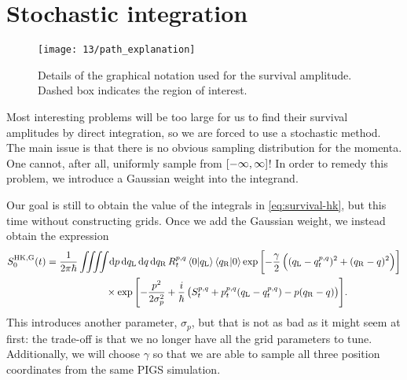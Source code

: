 \section{Stochastic integration}


\begin{figure}[h]
	\centering
	\texttt{[image: 13/path\_explanation]}
	\caption[
		Graphical notation for survival amplitude
	]{
		Details of the graphical notation used for the survival amplitude.
		Dashed box indicates the region of interest.
	}
	\label{fig:survival-path-explanation}
\end{figure}

Most interesting problems will be too large for us to find their survival amplitudes by direct integration, so we are forced to use a stochastic method.
The main issue is that there is no obvious sampling distribution for the momenta.
One cannot, after all, uniformly sample from $\intcc{-\infty, \infty}$!
In order to remedy this problem, we introduce a Gaussian weight into the integrand.

Our goal is still to obtain the value of the integrals in \vref{eq:survival-hk}, but this time without constructing grids.
Once we add the Gaussian weight, we instead obtain the expression
\begin{align}
	S_0\hkg(t)
	&= \frac{1}{2 \pi \hbar} \iiiint\! \dif p \dif q\LLup \dif q \dif q\RRup \,
			R\coh{p}{q}_t \braket{0 | q\LLup} \braket{q\RRup | 0}
			\expb{-\frac{\gamma}{2} \left( (q\LLup - q\coh{p}{q}_t)^2 + (q\RRup - q)^2 \right)} \notag \\
	&\qquad\qquad\qquad\times
			\expb{
				-\frac{p^2}{2 \sigma_p^2}
				+ \frac{i}{\hbar} \left( S\coh{p}{q}_t + p\coh{p}{q}_t (q\LLup - q\coh{p}{q}_t) - p (q\RRup - q) \right)
			}.
\end{align}
This introduces another parameter, $\sigma_p$, but that is not as bad as it might seem at first: the trade-off is that we no longer have all the grid parameters to tune.
Additionally, we will choose $\gamma$ so that we are able to sample all three position coordinates from the same PIGS simulation.

